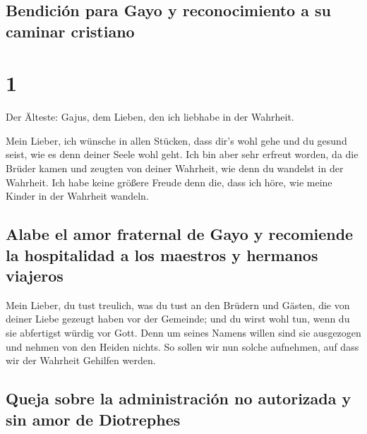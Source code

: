 \hypertarget{bendiciuxf3n-para-gayo-y-reconocimiento-a-su-caminar-cristiano}{%
\subsection{Bendición para Gayo y reconocimiento a su caminar
cristiano}\label{bendiciuxf3n-para-gayo-y-reconocimiento-a-su-caminar-cristiano}}

\hypertarget{section}{%
\section{1}\label{section}}

 Der Älteste: Gajus, dem Lieben, den ich liebhabe in der
Wahrheit.

 Mein Lieber, ich wünsche in allen Stücken, dass dir's
wohl gehe und du gesund seist, wie es denn deiner Seele wohl geht.
 Ich bin aber sehr erfreut worden, da die Brüder kamen und
zeugten von deiner Wahrheit, wie denn du wandelst in der Wahrheit.
 Ich habe keine größere Freude denn die, dass ich höre,
wie meine Kinder in der Wahrheit wandeln.

\hypertarget{alabe-el-amor-fraternal-de-gayo-y-recomiende-la-hospitalidad-a-los-maestros-y-hermanos-viajeros}{%
\subsection{Alabe el amor fraternal de Gayo y recomiende la hospitalidad
a los maestros y hermanos
viajeros}\label{alabe-el-amor-fraternal-de-gayo-y-recomiende-la-hospitalidad-a-los-maestros-y-hermanos-viajeros}}

 Mein Lieber, du tust treulich, was du tust an den Brüdern
und Gästen,  die von deiner Liebe gezeugt haben vor der
Gemeinde; und du wirst wohl tun, wenn du sie abfertigst würdig vor Gott.
 Denn um seines Namens willen sind sie ausgezogen und
nehmen von den Heiden nichts.  So sollen wir nun solche
aufnehmen, auf dass wir der Wahrheit Gehilfen werden.

\hypertarget{queja-sobre-la-administraciuxf3n-no-autorizada-y-sin-amor-de-diotrephes}{%
\subsection{Queja sobre la administración no autorizada y sin amor de
Diotrephes}\label{queja-sobre-la-administraciuxf3n-no-autorizada-y-sin-amor-de-diotrephes}}

